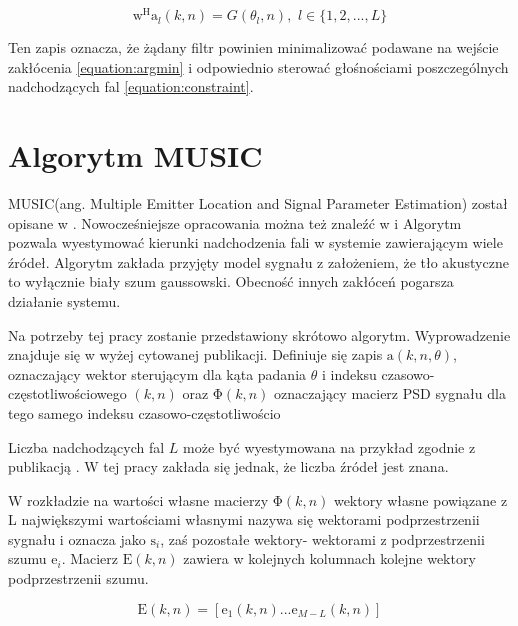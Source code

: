 \begin{equation}
    \label{equation:constraint}
    \bm{\mathrm{w}}^{\mathrm{H}}
    \bm{\mathrm{a}}_{l}(k,n)=
    G(\theta_{l},n),
    \, \, l \in \{1,2,...,L\}
\end{equation}

Ten zapis oznacza, że żądany filtr powinien minimalizować podawane na wejście zakłócenia \ref{equation:argmin} i odpowiednio sterować głośnościami poszczególnych nadchodzących fal \ref{equation:constraint}.

\section{Algorytm MUSIC}

MUSIC(ang. Multiple Emitter Location and Signal Parameter Estimation) został opisane w \cite{Schmidt1986}. Nowocześniejsze opracowania można też znaleźć w \cite{DOA} i \cite{Benesty2008} Algorytm pozwala wyestymować kierunki nadchodzenia fali w systemie zawierającym wiele źródeł. Algorytm zakłada przyjęty model sygnału z założeniem, że tło akustyczne to wyłącznie biały szum gaussowski. Obecność innych zakłóceń pogarsza działanie systemu.

\noindent Na potrzeby tej pracy zostanie przedstawiony skrótowo algorytm. Wyprowadzenie znajduje się w wyżej cytowanej publikacji. 
Definiuje się zapis $\bm{\mathrm{a}}(k,n,\theta)$, oznaczający wektor sterującym dla kąta padania $\theta$ i indeksu czasowo-częstotliwościowego $(k,n)$ oraz $\bm{\mathrm{\Phi}}(k,n)$ oznaczający macierz PSD sygnału dla tego samego indeksu czasowo-częstotliwościo

\noindent Liczba nadchodzących fal $L$ może być wyestymowana na przykład zgodnie z publikacją \cite{n_src}. W tej pracy zakłada się jednak, że liczba źródeł jest znana.

\noindent W rozkładzie na wartości własne macierzy $\bm{\mathrm{\Phi}}(k,n)$ wektory własne powiązane z L największymi wartościami własnymi nazywa się wektorami podprzestrzenii sygnału i oznacza jako $\bm{\mathrm{s}}_{i}$, zaś pozostałe wektory- wektorami z podprzestrzenii szumu $\bm{\mathrm{e}}_{i}$. Macierz $\bm{\mathrm{E}}(k,n)$ zawiera w kolejnych kolumnach kolejne wektory podprzestrzenii szumu.

\begin{equation}
    \label{equation:eigenvectors}
    \bm{\mathrm{E}}(k,n)=
    [\bm{\mathrm{e}}_{1}(k,n)...
    \bm{\mathrm{e}}_{M-L}(k,n)]
\end{equation}

